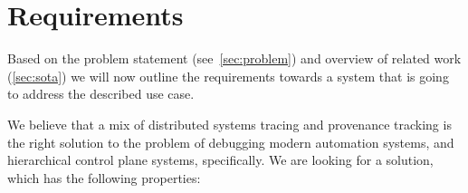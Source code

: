 \newpage
\chapter{Requirements}\label{sec:reqs}

Based on the problem statement (see~\cref{sec:problem}) and overview of related work (\cref{sec:sota}) we will now outline the requirements towards a system that is going to address the described use case.


We believe that a mix of distributed systems tracing and provenance tracking is the right solution to the problem of debugging modern automation systems, and hierarchical control plane systems, specifically. We are looking for a solution, which has the following properties:
%
%
